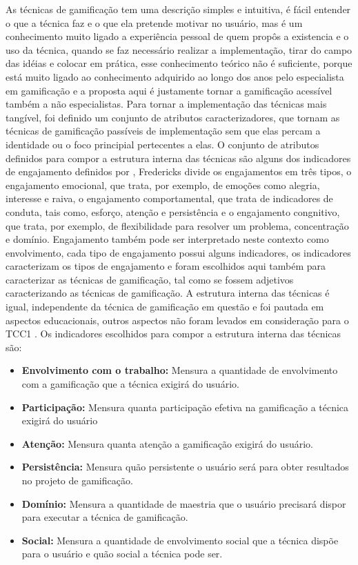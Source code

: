 As técnicas de gamificação tem uma descrição simples e intuitiva, é fácil entender o que a técnica faz e o que ela pretende motivar no usuário, mas é um conhecimento muito ligado a experiência pessoal de quem propôs a existencia e o uso da técnica, quando se faz necessário realizar a implementação, tirar do campo das idéias e colocar em prática, esse conhecimento teórico não é suficiente, porque está muito ligado ao conhecimento adquirido ao longo dos anos pelo especialista em gamificação e a proposta aqui é justamente tornar a gamificação acessível também a não especialistas. Para tornar a implementação das técnicas mais tangível, foi definido um conjunto de atributos caracterizadores, que tornam as técnicas de gamificação passíveis de implementação sem que elas percam a identidade ou o foco principial pertecentes a elas. O conjunto de atributos definidos para compor a estrutura interna das técnicas são alguns dos indicadores de engajamento definidos por \cite{fredericks2004school}, Fredericks divide os engajamentos em três tipos, o engajamento emocional, que trata, por exemplo, de emoções como alegria, interesse e raiva, o engajamento comportamental, que trata de indicadores de conduta, tais como, esforço, atenção e persistência e o engajamento congnitivo, que trata, por exemplo, de flexibilidade para resolver um problema, concentração e domínio. Engajamento também pode ser interpretado neste contexto como envolvimento, cada tipo de engajamento possui alguns indicadores, os indicadores caracterizam os tipos de engajamento e foram escolhidos aqui também para caracterizar as técnicas de gamificação, tal como se fossem adjetivos caracterizando as técnicas de gamificação. A estrutura interna das técnicas é igual, independente da técnica de gamificação em questão e foi pautada em aspectos educacionais, outros aspectos não foram levados em consideração para o TCC1 . Os indicadores escolhidos para compor a estrutura interna das técnicas são: 

\begin{itemize}
\item  \textbf {Envolvimento com o trabalho:}  Mensura a quantidade de envolvimento com a gamificação que a técnica exigirá do usuário.
\item  \textbf {Participação:}  Mensura quanta participação efetiva na gamificação a técnica exigirá do usuário
\item  \textbf {Atenção:}  Mensura quanta atenção a gamificação exigirá do usuário.
\item  \textbf {Persistência:} Mensura quão persistente o usuário será para obter resultados no projeto de gamificação. 
\item  \textbf {Domínio:} Mensura a quantidade de maestria que o usuário precisará dispor para executar a técnica de gamificação. 
\item  \textbf{Social:} Mensura a quantidade de envolvimento social que a técnica dispõe para o usuário e quão social a técnica pode ser.
\end{itemize}


